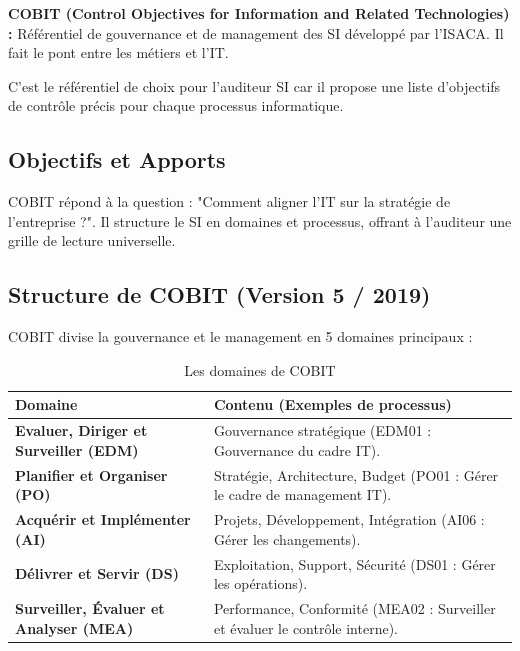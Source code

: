 \begin{boxdef}
\textbf{COBIT (Control Objectives for Information and Related Technologies) :} Référentiel de gouvernance et de management des SI développé par l'ISACA. Il fait le pont entre les métiers et l'IT.
\end{boxdef}

C'est le référentiel de choix pour l'auditeur SI car il propose une liste d'objectifs de contrôle précis pour chaque processus informatique.

\subsection{Objectifs et Apports}

COBIT répond à la question : "Comment aligner l'IT sur la stratégie de l'entreprise ?".
Il structure le SI en domaines et processus, offrant à l'auditeur une grille de lecture universelle.

\subsection{Structure de COBIT (Version 5 / 2019)}

COBIT divise la gouvernance et le management en 5 domaines principaux :

\begin{table}[h!]
\centering
\begin{tabular}{lp{10cm}}
    \toprule
    \textbf{Domaine} & \textbf{Contenu (Exemples de processus)} \\
    \midrule
    \textbf{Evaluer, Diriger et Surveiller (EDM)} & Gouvernance stratégique (EDM01 : Gouvernance du cadre IT). \\
    \midrule
    \textbf{Planifier et Organiser (PO)} & Stratégie, Architecture, Budget (PO01 : Gérer le cadre de management IT). \\
    \midrule
    \textbf{Acquérir et Implémenter (AI)} & Projets, Développement, Intégration (AI06 : Gérer les changements). \\
    \midrule
    \textbf{Délivrer et Servir (DS)} & Exploitation, Support, Sécurité (DS01 : Gérer les opérations). \\
    \midrule
    \textbf{Surveiller, Évaluer et Analyser (MEA)} & Performance, Conformité (MEA02 : Surveiller et évaluer le contrôle interne). \\
    \bottomrule
\end{tabular}
\caption{Les domaines de COBIT}
\end{table}

